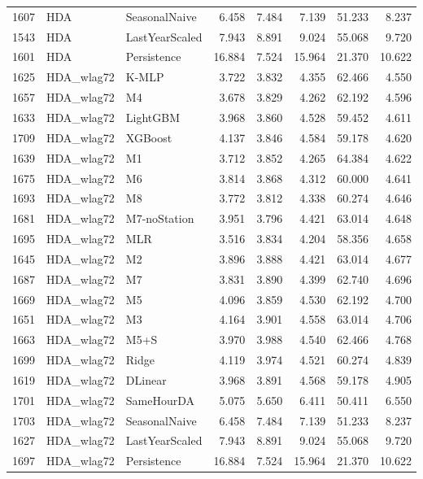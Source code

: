 \begin{tabular}{lllrrrrr}
1607 & HDA & SeasonalNaive & 6.458 & 7.484 & 7.139 & 51.233 & 8.237 \\
1543 & HDA & LastYearScaled & 7.943 & 8.891 & 9.024 & 55.068 & 9.720 \\
1601 & HDA & Persistence & 16.884 & 7.524 & 15.964 & 21.370 & 10.622 \\
1625 & HDA_wlag72 & K-MLP & 3.722 & 3.832 & 4.355 & 62.466 & 4.550 \\
1657 & HDA_wlag72 & M4 & 3.678 & 3.829 & 4.262 & 62.192 & 4.596 \\
1633 & HDA_wlag72 & LightGBM & 3.968 & 3.860 & 4.528 & 59.452 & 4.611 \\
1709 & HDA_wlag72 & XGBoost & 4.137 & 3.846 & 4.584 & 59.178 & 4.620 \\
1639 & HDA_wlag72 & M1 & 3.712 & 3.852 & 4.265 & 64.384 & 4.622 \\
1675 & HDA_wlag72 & M6 & 3.814 & 3.868 & 4.312 & 60.000 & 4.641 \\
1693 & HDA_wlag72 & M8 & 3.772 & 3.812 & 4.338 & 60.274 & 4.646 \\
1681 & HDA_wlag72 & M7-noStation & 3.951 & 3.796 & 4.421 & 63.014 & 4.648 \\
1695 & HDA_wlag72 & MLR & 3.516 & 3.834 & 4.204 & 58.356 & 4.658 \\
1645 & HDA_wlag72 & M2 & 3.896 & 3.888 & 4.421 & 63.014 & 4.677 \\
1687 & HDA_wlag72 & M7 & 3.831 & 3.890 & 4.399 & 62.740 & 4.696 \\
1669 & HDA_wlag72 & M5 & 4.096 & 3.859 & 4.530 & 62.192 & 4.700 \\
1651 & HDA_wlag72 & M3 & 4.164 & 3.901 & 4.558 & 63.014 & 4.706 \\
1663 & HDA_wlag72 & M5+S & 3.970 & 3.988 & 4.540 & 62.466 & 4.768 \\
1699 & HDA_wlag72 & Ridge & 4.119 & 3.974 & 4.521 & 60.274 & 4.839 \\
1619 & HDA_wlag72 & DLinear & 3.968 & 3.891 & 4.568 & 59.178 & 4.905 \\
1701 & HDA_wlag72 & SameHourDA & 5.075 & 5.650 & 6.411 & 50.411 & 6.550 \\
1703 & HDA_wlag72 & SeasonalNaive & 6.458 & 7.484 & 7.139 & 51.233 & 8.237 \\
1627 & HDA_wlag72 & LastYearScaled & 7.943 & 8.891 & 9.024 & 55.068 & 9.720 \\
1697 & HDA_wlag72 & Persistence & 16.884 & 7.524 & 15.964 & 21.370 & 10.622 \\
\bottomrule
\end{tabular}

